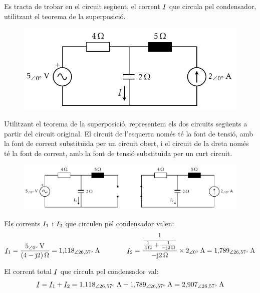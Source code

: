 \begin{exemple}
    Es tracta de trobar en el circuit seg\"{u}ent, el corrent $\cmplx{I}$ que circula
    pel condensador, utilitzant el teorema de la superposici\'{o}.
    \begin{figure}[htb]
        \centering
        \includegraphics{Imatges/Cap-Fonaments-Exemple-Superposicio-1.pdf}
    \end{figure}

    Utilitzant el teorema de la superposici\'{o}, representem els dos
    circuits seg\"{u}ents a partir del circuit original. El circuit de
    l'esquerra nom\'{e}s t\'{e} la font de tensi\'{o}, amb la font de corrent
    substitu\"{\i}da per un circuit obert, i el circuit de
    la dreta nom\'{e}s t\'{e} la font de corrent, amb la font de tensi\'{o}
    substitu\"{\i}da per un curt circuit.
    \begin{figure}[htb]
        \centering
        \includegraphics{Imatges/Cap-Fonaments-Exemple-Superposicio-2.pdf}
    \end{figure}

    Els corrents $\cmplx{I}_1$ i $\cmplx{I}_2$ que circulen pel condensador valen:
    \[
        \cmplx{I}_1 = \frac{5_{\angle 0\degree}\unit{V}}{(4-\ju
        2)\unit{\ohm}} = 1{,}118_{\angle
        26{,}57\degree}\unit{A} \qquad\qquad
        \cmplx{I}_2 = \frac{\dfrac{1}{\frac{1}{4\unit{\ohm}}+\frac{1}{-\ju 2\unit{\ohm}}}}
        {-\ju 2\unit{\ohm}} \times 2_{\angle 0\degree}\unit{A} = 1{,}789_{\angle
        26{,}57\degree}\unit{A}
    \]

    El corrent total $\cmplx{I}$ que circula pel condensador val:
    \[
        \cmplx{I}  = \cmplx{I}_1 + \cmplx{I}_2 = 1{,}118_{\angle
        26{,}57\degree}\unit{A} + 1{,}789_{\angle
        26{,}57\degree}\unit{A} =
        2{,}907_{\angle 26{,}57\degree}\unit{A}
    \]
\end{exemple}


